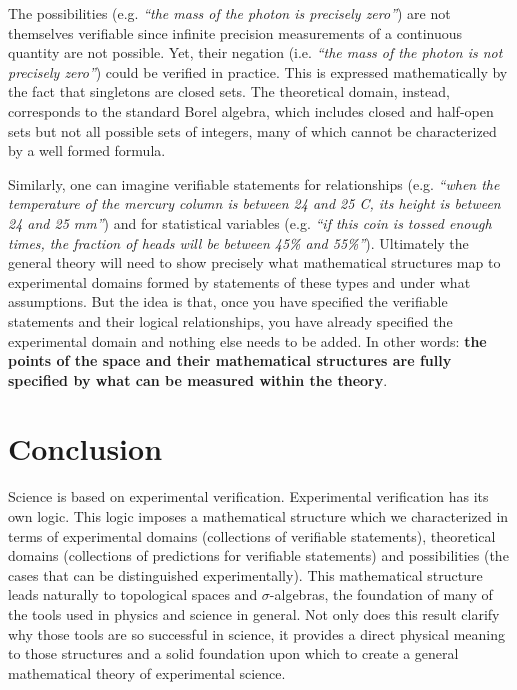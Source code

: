 \documentclass[%
reprint,
amsmath,amssymb,
aps,
prx,
]{revtex4-1}
\theoremstyle{plain}%
\theoremstyle{definition}
\theoremstyle{remark}
\newcommand{\statement}[1] {\emph{``#1''}}
\begin{document}
The possibilities (e.g. \statement{the mass of the photon is precisely zero}) are not themselves verifiable since infinite precision measurements of a continuous quantity are not possible. Yet, their negation (i.e. \statement{the mass of the photon is not precisely zero}) could be verified in practice. This is expressed mathematically by the fact that singletons are closed sets. The theoretical domain, instead, corresponds to the standard Borel algebra, which includes closed and half-open sets but not all possible sets of integers, many of which cannot be characterized by a well formed formula.

Similarly, one can imagine verifiable statements for relationships (e.g. \statement{when the temperature of the mercury column is between 24 and 25 C, its height is between 24 and 25 mm}) and for statistical variables (e.g. \statement{if this coin is tossed enough times, the fraction of heads will be between 45\% and 55\%}). Ultimately the general theory will need to show precisely what mathematical structures map to experimental domains formed by statements of these types and under what assumptions. But the idea is that, once you have specified the verifiable statements and their logical relationships, you have already specified the experimental domain and nothing else needs to be added. In other words: \textbf{the points of the space and their mathematical structures are fully specified by what can be measured within the theory}.

\section{Conclusion}

Science is based on experimental verification. Experimental verification has its own logic. This logic imposes a mathematical structure which we characterized in terms of experimental domains (collections of verifiable statements), theoretical domains (collections of predictions for verifiable statements) and possibilities (the cases that can be distinguished experimentally). This mathematical structure leads naturally to topological spaces and $\sigma$-algebras, the foundation of many of the tools used in physics and science in general. Not only does this result clarify why those tools are so successful in science, it provides a direct physical meaning to those structures and a solid foundation upon which to create a general mathematical theory of experimental science.
\end{document}
